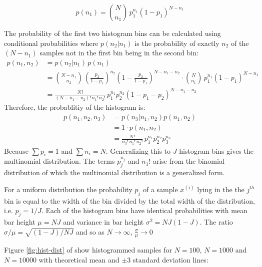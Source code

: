 \documentclass[12pt]{article}
\begin{document}
\begin{equation}
	p(n_1) = \binom {N} {n_1} \, p_1^{n_1} (1-p_1)^{N - n_1}
\end{equation}

The probability of the first two histogram bins can be calculated using conditional probabilities where $p(n_2|n_1)$ is the probability of exactly $n_2$ of the $(N-n_1)$ samples not in the first bin being in the second bin:
\begin{align}
	p(n_1, n_2) &= p(n_2 | n_1) \, p(n_1) \nonumber \\
    			&= \binom {N {-} n_1}{n_2} \, 
                	\left( \frac {p_2} {1 - p_1} \right)^{n_2} 
                	\left( 1 - \frac {p_2} {1-p_1} \right) ^ {N - n_1 - n_2} 
                	\cdot \binom {N}{n_1} \, p_1^{n_1} (1-p_1)^{N - n_1} \nonumber \\
                &= \frac {N\,!} {(N - n_1 - n_2)!\, n_1!\, n_2!} \,
                	p_1^{n_1} p_2^{n_2} (1 - p_1 - p_2)^{N - n_1 - n_2}
\end{align}
Therefore, the probablitiy of the histogram is:
\begin{align}
	p(n_1, n_2, n_3) &= p(n_3 | n_1, n_2) p(n_1, n_2) \nonumber \\
                     &= 1 \cdot p(n_1, n_2) \nonumber \\
                     &= \frac {N\,!} {n_3!\, n_1!\, n_2!} \, p_1^{n_1} p_2^{n_2} p_3^{n_3}
\end{align}
Because $\sum p_i = 1$ and $\sum n_i = N$. Generalizing this to $J$ histogram bins gives the multinomial distribution. The terms $p_j^{n_j}$ and $n_1!$ arise from the binomial distribution of which the multinomial distribution is a generalized form. 

For a uniform distribution the probability $p_j$ of a sample  $x^{(i)}$ lying in the the $j^{th}$ bin is equal to the width of the bin divided by the total width of the distribution, i.e.  $p_j = 1/J$. Each of the histogram bins have identical probabilities with mean bar height  $\mu = NJ$ and variance in bar height $\sigma^2 = NJ(1-J)$. The ratio $\sigma / \mu = \sqrt {(1-J) / NJ}$ and so as $N \to \infty$, $\frac \sigma \mu \to 0$

Figure \ref{fig:hist-dist} of show histogrammed samples for $N=100$,  $N=1000$ and $N=10000$ with theoretical mean  and $\pm 3$ standard deviation lines:
\end{document}
